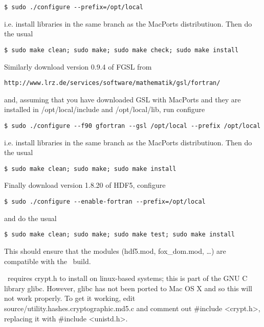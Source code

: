 \begin{verbatim}
$ sudo ./configure --prefix=/opt/local
\end{verbatim}

i.e. install libraries in the same branch as the MacPorts distributiuon. Then do the usual

\begin{verbatim}
$ sudo make clean; sudo make; sudo make check; sudo make install
\end{verbatim}

Similarly download version 0.9.4 of FGSL from

\begin{verbatim}
http://www.lrz.de/services/software/mathematik/gsl/fortran/
\end{verbatim}

and, assuming that you have downloaded GSL with MacPorts and they are installed in {\normalfont \ttfamily /opt/local/include} and {\normalfont \ttfamily /opt/local/lib}, run {\normalfont \ttfamily configure}

\begin{verbatim}
$ sudo ./configure --f90 gfortran --gsl /opt/local --prefix /opt/local
\end{verbatim}

i.e. install libraries in the same branch as the MacPorts distributiuon. Then do the usual

\begin{verbatim}
$ sudo make clean; sudo make; sudo make install
\end{verbatim}

Finally download version 1.8.20 of HDF5, configure

\begin{verbatim}
$ sudo ./configure --enable-fortran --prefix=/opt/local
\end{verbatim}

and do the usual

\begin{verbatim}
$ sudo make clean; sudo make; sudo make test; sudo make install
\end{verbatim}

This should ensure that the modules ({\normalfont \ttfamily hdf5.mod}, {\normalfont \ttfamily fox\_dom.mod}, \ldots) are compatible with the \glc\ build.

\glc\ requires {\normalfont \ttfamily crypt.h} to install on linux-based systems; this is part of the GNU C library {\normalfont \ttfamily glibc}. However, {\normalfont \ttfamily glibc} has not been ported to Mac OS X and so this will not work properly. To get it working, edit {\normalfont \ttfamily source/utility.hashes.cryptographic.md5.c} and comment out {\normalfont \ttfamily \#include \textless crypt.h\textgreater}, replacing it with {\normalfont \ttfamily \#include \textless unistd.h\textgreater}.

